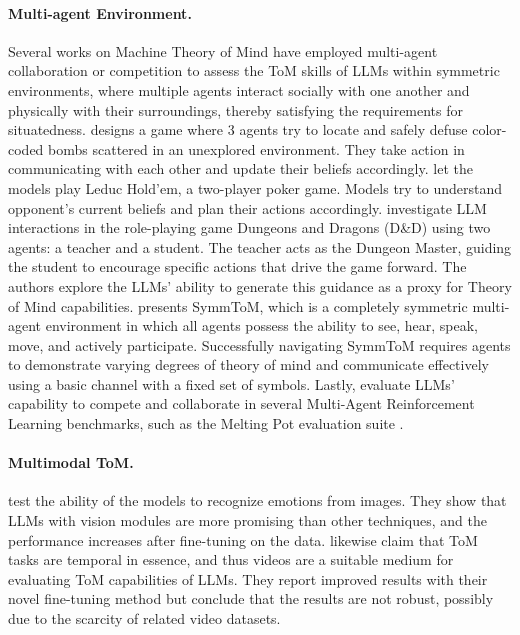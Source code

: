 \paragraph{Multi-agent Environment.} Several works on Machine Theory of Mind \cite{Li_2023, guo2023suspicionagentplayingimperfectinformation, zhou2023i, pmlr-v162-sclar22a, cross2024hypotheticalmindsscaffoldingtheory} have employed multi-agent collaboration or competition to assess the ToM skills of LLMs within symmetric environments, where multiple agents interact socially with one another and physically with their surroundings, thereby satisfying the requirements for situatedness. \citet{Li_2023} designs a game where 3 agents try to locate and safely defuse color-coded bombs scattered in an unexplored environment. They take action in communicating with each other and update their beliefs accordingly. \citet{guo2023suspicionagentplayingimperfectinformation} let the models play Leduc Hold’em, a two-player poker game. Models try to understand opponent's current beliefs and plan their actions accordingly. \citet{zhou2023i} investigate LLM interactions in the role-playing game Dungeons and Dragons (D\&D) using two agents: a teacher and a student. The teacher acts as the Dungeon Master, guiding the student to encourage specific actions that drive the game forward. The authors explore the LLMs' ability to generate this guidance as a proxy for Theory of Mind capabilities. \citet{pmlr-v162-sclar22a} presents SymmToM, which is a completely symmetric multi-agent environment in which all agents possess the ability to see, hear, speak, move, and actively participate. Successfully navigating SymmToM requires agents to demonstrate varying degrees of theory of mind and communicate effectively using a basic channel with a fixed set of symbols. Lastly, \citet{cross2024hypotheticalmindsscaffoldingtheory} evaluate LLMs' capability to compete and collaborate in several Multi-Agent Reinforcement Learning benchmarks, such as the Melting Pot evaluation suite \citep{leibo2021scalableevaluationmultiagentreinforcement}.

\paragraph{Multimodal ToM.} \citet{etesam2024contextualemotionrecognitionusing} test the ability of the models to recognize emotions from images. They show that LLMs with vision modules are more promising than other techniques, and the performance increases after fine-tuning on the data. \citet{chen2024theorymindseyereading} likewise claim that ToM tasks are temporal in essence, and thus videos are a suitable medium for evaluating ToM capabilities of LLMs. They report improved results with their novel fine-tuning method but conclude that the results are not robust, possibly due to the scarcity of related video datasets.

